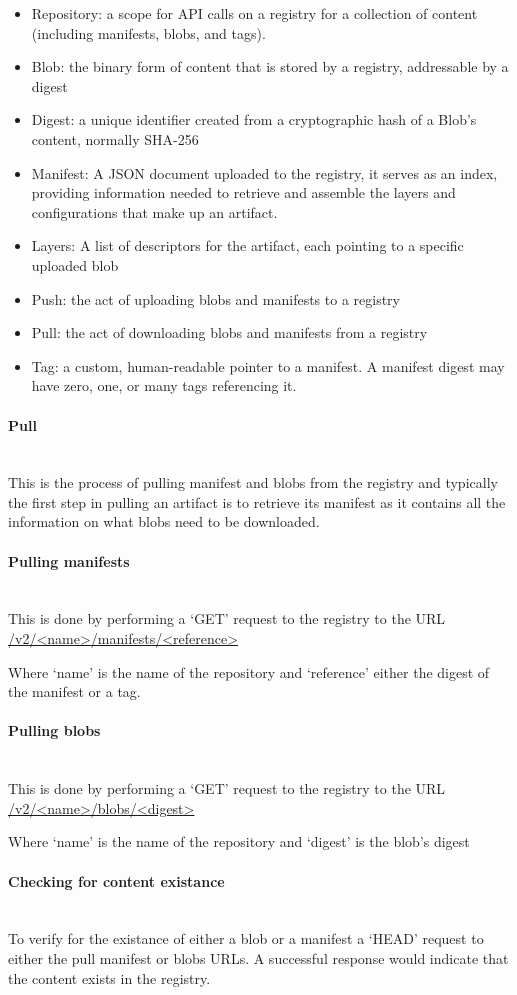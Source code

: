 \documentclass{article}
\newcommand{\subsubsubsection}[1]{\paragraph{#1}\mbox{}\\}
\begin{document}
  \begin{itemize}
    \item Repository: a scope for API calls on a registry for a collection of content (including manifests, blobs, and tags).
    \item Blob: the binary form of content that is stored by a registry, addressable by a digest
    \item Digest: a unique identifier created from a cryptographic hash of a Blob's content, normally SHA-256
    \item Manifest: A JSON document uploaded to the registry, it serves as an index, providing information needed to retrieve and assemble the layers and configurations that make up an artifact.
    \item Layers: A list of descriptors for the artifact, each pointing to a specific uploaded blob
    \item Push: the act of uploading blobs and manifests to a registry
    \item Pull: the act of downloading blobs and manifests from a registry    
    \item Tag: a custom, human-readable pointer to a manifest. A manifest digest may have zero, one, or many tags referencing it.
  \end{itemize}
  
  \subsubsubsection{Pull}

  This is the process of pulling manifest and blobs from the registry and typically the first step in pulling an artifact is to retrieve its manifest as it contains all the information on what blobs need to be downloaded.

  \subsubsubsection{Pulling manifests}
  
  This is done by performing a `GET' request to the registry to the URL \url{/v2/<name>/manifests/<reference>}

  Where `name' is the name of the repository and `reference' either the digest of the manifest or a tag.

  \subsubsubsection{Pulling blobs}

  This is done by performing a `GET' request to the registry to the URL \url{/v2/<name>/blobs/<digest>}

  Where `name' is the name of the repository and `digest' is the blob's digest

  \subsubsubsection{Checking for content existance}

  To verify for the existance of either a blob or a manifest a `HEAD' request to either the pull manifest or blobs URLs. A successful response would indicate that the content exists in the registry.
\end{document}
